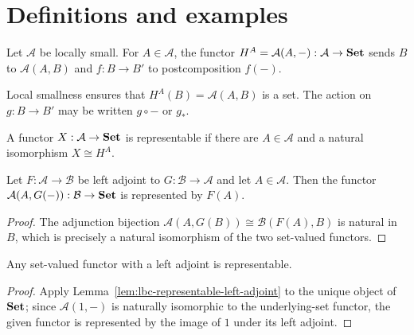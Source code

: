 \section{Definitions and examples}
\begin{definition}
\label{def:lbc-representable-cov}
Let $\mathcal A$ be locally small. For $A\in\mathcal A$, the functor
$H^A=\mathcal A(A,-):\mathcal A\to\mathbf{Set}$ sends $B$ to $\mathcal A(A,B)$ and
$f:B\to B'$ to postcomposition $f(-)$.
\end{definition}

\begin{remark}
\label{rem:lbc-representable-notation}
Local smallness ensures that $H^A(B)=\mathcal A(A,B)$ is a set. The action on
$g:B\to B'$ may be written $g\circ-$ or $g_*$.
\end{remark}

\begin{definition}
\label{def:lbc-representable}
A functor $X:\mathcal A\to\mathbf{Set}$ is representable if there are $A\in\mathcal A$
and a natural isomorphism $X\cong H^A$.
\end{definition}

\begin{lemma}
\label{lem:lbc-representable-left-adjoint}
Let $F:\mathcal A\to\mathcal B$ be left adjoint to $G:\mathcal B\to\mathcal A$
and let $A\in\mathcal A$. Then the functor
$\mathcal A(A,G(-)):\mathcal B\to\mathbf{Set}$ is represented by $F(A)$.
\end{lemma}
\begin{proof}
The adjunction bijection $\mathcal A(A,G(B))\cong\mathcal B(F(A),B)$ is
natural in $B$, which is precisely a natural isomorphism of the two set-valued
functors.
\end{proof}

\begin{proposition}
\label{prop:lbc-left-adjoint-representable}
Any set-valued functor with a left adjoint is representable.
\end{proposition}
\begin{proof}
Apply Lemma~\ref{lem:lbc-representable-left-adjoint} to the unique object of
$\mathbf{Set}$; since $\mathcal A(1,-)$ is naturally isomorphic to the underlying-set
functor, the given functor is represented by the image of $1$ under its left
adjoint.
\end{proof}

